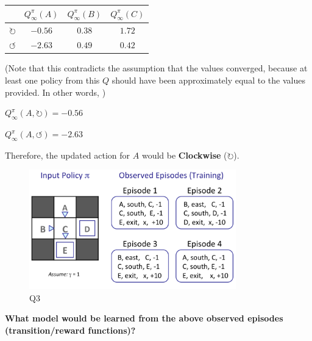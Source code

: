 \documentclass{homework}
\def\clockwise{\circlearrowright}
\def\counterclockwise{\circlearrowleft}
\begin{document}
\begin{table}[h!]
    \centering
    \begin{tabular}{cccc}
        \toprule
        & $Q_{\infty}^{\pi}(A)$ & $Q_{\infty}^{\pi}(B)$ & $Q_{\infty}^{\pi}(C)$ \\
        \midrule
        $\clockwise$ & $-0.56$ & $0.38$ & $1.72$ \\
        $\counterclockwise$ & $-2.63$ & $0.49$ & $0.42$ \\
        \bottomrule
    \end{tabular}
\end{table}

(Note that this contradicts the assumption that the values converged, because at least one policy from this $Q$ should have been approximately equal to the values provided. In other words, )

$Q_{\infty}^{\pi}(A, \clockwise) = -0.56$

$Q_{\infty}^{\pi}(A, \counterclockwise) = -2.63$

Therefore, the updated action for $A$ would be \textbf{Clockwise} ($\clockwise$).

\clearpage
\exercise[3]
\begin{figure}[h!]
    \centering
    \includegraphics[width=0.8\textwidth]{figures/q3.png}
    \caption{Q3}
    \label{fig:q3}
\end{figure}
\textbf{\large What model would be learned from the above observed episodes (transition/reward functions)?}
\end{document}
